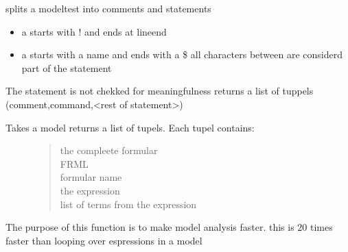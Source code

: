\documentclass[letterpaper,10pt,english]{sphinxmanual}
\begin{document}

\begin{fulllineitems}
\label{\detokenize{core/modelpattern:modelpattern.find_statements}}
\pysigstartsignatures
{}
\pysigstopsignatures
\sphinxAtStartPar
splits a modeltest into comments and statements
\begin{itemize}
\item {} 
\sphinxAtStartPar
a  starts with ! and ends at lineend

\item {} 
\sphinxAtStartPar
a  starts with a name and ends with a \$ all characters between are considerd part of the statement

\end{itemize}

\sphinxAtStartPar
The statement is not chekked for meaningfulness
returns a list of tuppels (comment,command,\textless{}rest of statement\textgreater{})

\end{fulllineitems}


\begin{fulllineitems}
\label{\detokenize{core/modelpattern:modelpattern.model_parse_old}}
\pysigstartsignatures
{}
\pysigstopsignatures\begin{description}
\item[{Takes a model returns a list of tupels. Each tupel contains:}] \leavevmode\begin{quote}\begin{description}
\item[{the compleete formular}] \leavevmode
\item[{FRML}] \leavevmode
\item[{formular name}] \leavevmode
\item[{the expression}] \leavevmode
\item[{list of terms from the expression}] \leavevmode
\end{description}\end{quote}

\end{description}

\sphinxAtStartPar
The purpose of this function is to make model analysis faster. this is 20 times faster than looping over espressions in a model

\end{fulllineitems}
\end{document}
